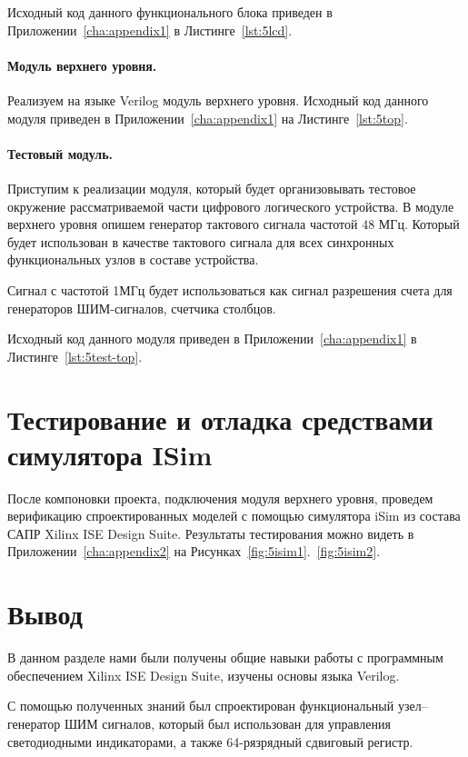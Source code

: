 Исходный код данного функционального блока приведен в Приложении~\ref{cha:appendix1} в Листинге~\ref{lst:5lcd}.

\paragraph{Модуль верхнего уровня.}
Реализуем на языке Verilog модуль верхнего уровня.
Исходный код данного модуля приведен в Приложении~\ref{cha:appendix1} на Листинге~\ref{lst:5top}.

\paragraph{Тестовый модуль.}
Приступим к реализации модуля, который будет организовывать тестовое окружение рассматриваемой части цифрового логического устройства. В модуле верхнего уровня опишем генератор тактового сигнала частотой 48 МГц. Который будет использован в качестве тактового сигнала для всех синхронных функциональных узлов в составе устройства. 

Сигнал с частотой 1МГц будет использоваться как сигнал разрешения счета для генераторов ШИМ-сигналов, счетчика столбцов.

Исходный код данного модуля приведен в Приложении~\ref{cha:appendix1} в Листинге~\ref{lst:5test-top}.





\section{Тестирование и отладка средствами симулятора ISim}
После компоновки проекта, подключения модуля верхнего уровня, проведем верификацию спроектированных моделей с помощью симулятора iSim из состава САПР Xilinx ISE Design Suite. Результаты тестирования можно видеть в Приложении~\ref{cha:appendix2} на Рисунках~\ref{fig:5isim1}.~\ref{fig:5isim2}.





\section{Вывод}

В данном разделе нами были получены общие навыки работы с программным обеспечением Xilinx ISE Design Suite, изучены основы языка Verilog.

С помощью полученных знаний был спроектирован функциональный узел--генератор ШИМ сигналов, который был использован для управления светодиодными индикаторами, а также 64-рязрядный сдвиговый регистр.


